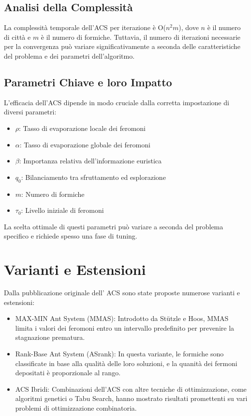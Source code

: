 \subsection{Analisi della Complessità}
La complessità temporale dell'\gls{ACS} per iterazione è O($n^2m$), dove $n$ è il numero di città e $m$ è il numero di formiche. Tuttavia, il numero di iterazioni necessarie per la convergenza può variare significativamente a seconda delle caratteristiche del problema e dei parametri dell'algoritmo.

\subsection{Parametri Chiave e loro Impatto}
L'efficacia dell'\gls{ACS} dipende in modo cruciale dalla corretta impostazione di diversi parametri:

\begin{itemize}
	\item $\rho$: Tasso di evaporazione locale dei feromoni
	\item $\alpha$: Tasso di evaporazione globale dei feromoni
	\item $\beta$: Importanza relativa dell'informazione euristica
	\item $q_0$: Bilanciamento tra sfruttamento ed esplorazione
	\item $m$: Numero di formiche
	\item $\tau_0$: Livello iniziale di feromoni
\end{itemize}

La scelta ottimale di questi parametri può variare a seconda del problema specifico e richiede spesso una fase di tuning.

\section{Varianti e Estensioni}

Dalla pubblicazione originale dell' \gls{ACS} sono state proposte numerose varianti e estensioni:
\begin{itemize}
	\item MAX-MIN Ant System (\gls{MMAS}): Introdotto da Stützle e Hoos, \gls{MMAS} limita i valori dei feromoni entro un intervallo predefinito per prevenire la stagnazione prematura. \cite{Stuetzle1997}
	\item Rank-Base Ant System (\gls{ASrank}): In questa variante, le formiche sono classificate in base alla qualità delle loro soluzioni, e la quanità dei fermoni depositati è proporzionale al rango.
	\item ACS Ibridi: Combinazioni dell'ACS con altre tecniche di ottimizzazione, come algoritmi genetici o Tabu Search, hanno mostrato risultati promettenti su vari problemi di ottimizzazione combinatoria.
\end{itemize}

